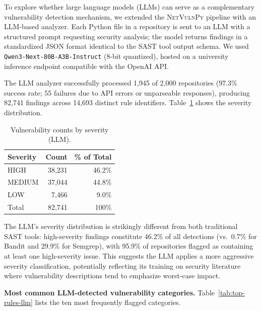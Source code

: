 \documentclass[sigconf,authordraft]{acmart}
\begin{document}
To explore whether large language models (LLMs) can serve as a
complementary vulnerability detection mechanism, we extended the
\textsc{NetVulnPy} pipeline with an LLM-based analyzer. Each Python
file in a repository is sent to an LLM with a structured prompt
requesting security analysis; the model returns findings in a
standardized JSON format identical to the SAST tool output schema. We
used \texttt{Qwen3-Next-80B-A3B-Instruct} (8-bit quantized), hosted on
a university inference endpoint compatible with the OpenAI API.

The LLM analyzer successfully processed 1{,}945 of 2{,}000 repositories
(97.3\% success rate; 55 failures due to API errors or unparseable
responses), producing 82{,}741 findings across 14{,}693 distinct rule
identifiers. Table~\ref{tab:severity-llm} shows the severity
distribution.

\begin{table}[h]
  \caption{Vulnerability counts by severity (LLM).}
  \label{tab:severity-llm}
  \begin{tabular}{lrr}
    \toprule
    Severity & Count & \% of Total \\
    \midrule
    HIGH   & 38{,}231 & 46.2\% \\
    MEDIUM & 37{,}044 & 44.8\% \\
    LOW    &  7{,}466 &  9.0\% \\
    \midrule
    Total  & 82{,}741 & 100\% \\
    \bottomrule
  \end{tabular}
\end{table}

The LLM's severity distribution is strikingly different from both
traditional SAST tools: high-severity findings constitute 46.2\% of all
detections (vs.\ 0.7\% for Bandit and 29.9\% for Semgrep), with 95.9\%
of repositories flagged as containing at least one high-severity issue.
This suggests the LLM applies a more aggressive severity classification,
potentially reflecting its training on security literature where
vulnerability descriptions tend to emphasize worst-case impact.

\textbf{Most common LLM-detected vulnerability categories.}
Table~\ref{tab:top-rules-llm} lists the ten most frequently flagged
categories.
\end{document}
